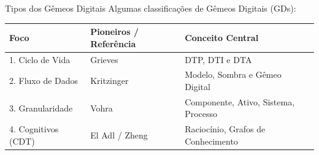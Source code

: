 \documentclass[aspectratio=169,xcolor=dvipsnames]{beamer}
\begin{document}
\begin{frame}{Tipos dos Gêmeos Digitais}
    Algumas classificações de Gêmeos Digitais (GDs):
    \vspace{0.4em}
    \centering
    \footnotesize
    \begin{tabular}{p{3.5cm}p{3.0cm}p{5.3cm}}
        \toprule
        \textbf{Foco} & \textbf{Pioneiros / Referência} & \textbf{Conceito Central} \\
        \midrule
        1. Ciclo de Vida & Grieves \cite{grieves2017dt} & DTP, DTI e DTA \\
        2. Fluxo de Dados & Kritzinger \cite{fuller2020dt} & Modelo, Sombra e Gêmeo Digital \\
        3. Granularidade & Vohra \cite{vohra2022dt} & Componente, Ativo, Sistema, Processo \\
        4. Cognitivos (CDT) & El Adl \cite{eladl2016cdt} / Zheng \cite{zheng2022emergence} & Raciocínio, Grafos de Conhecimento \\
        \bottomrule
    \end{tabular}
\end{frame}
\end{document}
